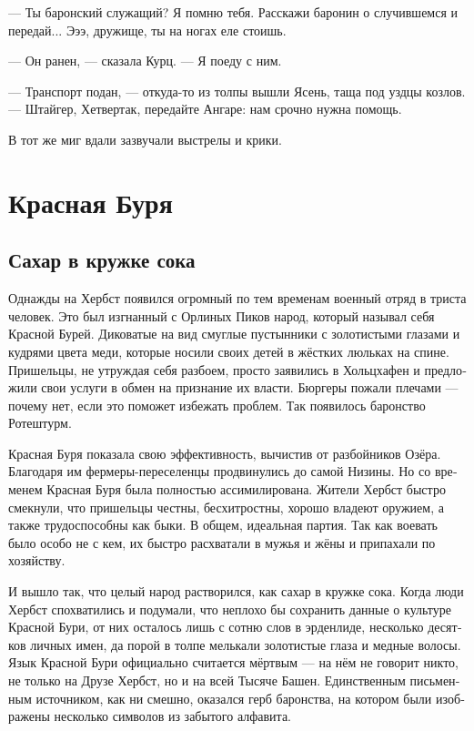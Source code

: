 \documentclass[a4paper,12pt,fleqn]{book}\usepackage{cooltooltips}\usepackage{polyglossia}\setdefaultlanguage[babelshorthands=true]{russian}\setotherlanguage{english}\defaultfontfeatures{Ligatures=TeX,Mapping=tex-text} \usepackage{xcolor}\definecolor{lightgray}{HTML}{bbbbbb}\color{lightgray}\newcommand{\ml}[3]{\textenglish{\textcolor{black}{#3}}}
\begin{document}
--- Ты баронский служащий?
Я помню тебя.
Расскажи баронин о случившемся и передай...
Эээ, дружище, ты на ногах еле стоишь.

--- Он ранен, --- сказала Курц.
--- Я поеду с ним.

--- Транспорт подан, --- откуда-то из толпы вышли Ясень, таща под уздцы козлов.
--- Штайгер, Хетвертак, передайте Ангаре: нам срочно нужна помощь.

В тот же миг вдали зазвучали выстрелы и крики.

\chapter{Красная Буря}

\section{Сахар в кружке сока}

Однажды на Хербст появился огромный по тем временам военный отряд в триста человек.
Это был изгнанный с Орлиных Пиков народ, который называл себя Красной Бурей.
Диковатые на вид смуглые пустынники с золотистыми глазами и кудрями цвета меди, которые носили своих детей в жёстких люльках на спине.
Пришельцы, не утруждая себя разбоем, просто заявились в Хольцхафен и предложили свои услуги в обмен на признание их власти.
Бюргеры пожали плечами --- почему нет, если это поможет избежать проблем.
Так появилось баронство Ротештурм.

Красная Буря показала свою эффективность, вычистив от разбойников Озёра.
Благодаря им фермеры-переселенцы продвинулись до самой Низины.
Но со временем Красная Буря была полностью ассимилирована.
Жители Хербст быстро смекнули, что пришельцы честны, бесхитростны, хорошо владеют оружием, а также трудоспособны как быки.
В общем, идеальная партия.
Так как воевать было особо не с кем, их быстро расхватали в мужья и жёны и припахали по хозяйству.

И вышло так, что целый народ растворился, как сахар в кружке сока.
Когда люди Хербст спохватились и подумали, что неплохо бы сохранить данные о культуре Красной Бури, от них осталось лишь с сотню слов в эрденлиде, несколько десятков личных имен, да порой в толпе мелькали золотистые глаза и медные волосы.
Язык Красной Бури официально считается мёртвым --- на нём не говорит никто, не только на Друзе Хербст, но и на всей Тысяче Башен.
Единственным письменным источником, как ни смешно, оказался герб баронства, на котором были изображены несколько символов из забытого алфавита.
\end{document}
